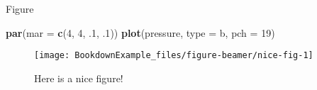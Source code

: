 \documentclass[
  ignorenonframetext,
  noamsthm,11pt,a4paper,blue,xcolor=table]{beamer}
\newenvironment{Shaded}{\begin{snugshade}}{\end{snugshade}}
\newcommand{\DataTypeTok}[1]{\textcolor[rgb]{0.13,0.29,0.53}{#1}}
\newcommand{\DecValTok}[1]{\textcolor[rgb]{0.00,0.00,0.81}{#1}}
\newcommand{\FloatTok}[1]{\textcolor[rgb]{0.00,0.00,0.81}{#1}}
\newcommand{\KeywordTok}[1]{\textcolor[rgb]{0.13,0.29,0.53}{\textbf{#1}}}
\newcommand{\NormalTok}[1]{#1}
\newcommand{\StringTok}[1]{\textcolor[rgb]{0.31,0.60,0.02}{#1}}
\begin{document}
\begin{frame}{}
\protect\hypertarget{section}{}
\titlepage
\end{frame}

\begin{frame}[fragile]{Figure}
\protect\hypertarget{figure}{}
\begin{Shaded}
\begin{Highlighting}[]
\KeywordTok{par}\NormalTok{(}\DataTypeTok{mar =} \KeywordTok{c}\NormalTok{(}\DecValTok{4}\NormalTok{, }\DecValTok{4}\NormalTok{, }\FloatTok{.1}\NormalTok{, }\FloatTok{.1}\NormalTok{))}
\KeywordTok{plot}\NormalTok{(pressure, }\DataTypeTok{type =} \StringTok{\textquotesingle{}b\textquotesingle{}}\NormalTok{, }\DataTypeTok{pch =} \DecValTok{19}\NormalTok{)}
\end{Highlighting}
\end{Shaded}

\begin{figure}

{\centering \texttt{[image: BookdownExample\_files/figure-beamer/nice-fig-1]} 

}

\caption{Here is a nice figure!}\label{fig:nice-fig}
\end{figure}
\end{frame}
\end{document}
